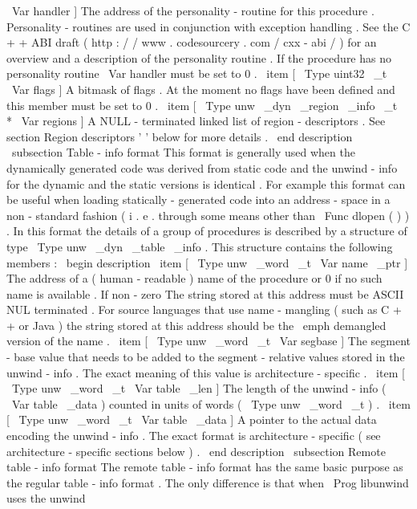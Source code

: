 \
Var
{
handler
}
]
The
address
of
the
personality
-
routine
for
this
procedure
.
Personality
-
routines
are
used
in
conjunction
with
exception
handling
.
See
the
C
+
+
ABI
draft
(
http
:
/
/
www
.
codesourcery
.
com
/
cxx
-
abi
/
)
for
an
overview
and
a
description
of
the
personality
routine
.
If
the
procedure
has
no
personality
routine
\
Var
{
handler
}
must
be
set
to
0
.
\
item
[
\
Type
{
uint32
\
_t
}
\
Var
{
flags
}
]
A
bitmask
of
flags
.
At
the
moment
no
flags
have
been
defined
and
this
member
must
be
set
to
0
.
\
item
[
\
Type
{
unw
\
_dyn
\
_region
\
_info
\
_t
~
*
}
\
Var
{
regions
}
]
A
NULL
-
terminated
linked
list
of
region
-
descriptors
.
See
section
Region
descriptors
'
'
below
for
more
details
.
\
end
{
description
}
\
subsection
{
Table
-
info
format
}
This
format
is
generally
used
when
the
dynamically
generated
code
was
derived
from
static
code
and
the
unwind
-
info
for
the
dynamic
and
the
static
versions
is
identical
.
For
example
this
format
can
be
useful
when
loading
statically
-
generated
code
into
an
address
-
space
in
a
non
-
standard
fashion
(
i
.
e
.
through
some
means
other
than
\
Func
{
dlopen
}
(
)
)
.
In
this
format
the
details
of
a
group
of
procedures
is
described
by
a
structure
of
type
\
Type
{
unw
\
_dyn
\
_table
\
_info
}
.
This
structure
contains
the
following
members
:
\
begin
{
description
}
\
item
[
\
Type
{
unw
\
_word
\
_t
}
\
Var
{
name
\
_ptr
}
]
The
address
of
a
(
human
-
readable
)
name
of
the
procedure
or
0
if
no
such
name
is
available
.
If
non
-
zero
The
string
stored
at
this
address
must
be
ASCII
NUL
terminated
.
For
source
languages
that
use
name
-
mangling
(
such
as
C
+
+
or
Java
)
the
string
stored
at
this
address
should
be
the
\
emph
{
demangled
}
version
of
the
name
.
\
item
[
\
Type
{
unw
\
_word
\
_t
}
\
Var
{
segbase
}
]
The
segment
-
base
value
that
needs
to
be
added
to
the
segment
-
relative
values
stored
in
the
unwind
-
info
.
The
exact
meaning
of
this
value
is
architecture
-
specific
.
\
item
[
\
Type
{
unw
\
_word
\
_t
}
\
Var
{
table
\
_len
}
]
The
length
of
the
unwind
-
info
(
\
Var
{
table
\
_data
}
)
counted
in
units
of
words
(
\
Type
{
unw
\
_word
\
_t
}
)
.
\
item
[
\
Type
{
unw
\
_word
\
_t
}
\
Var
{
table
\
_data
}
]
A
pointer
to
the
actual
data
encoding
the
unwind
-
info
.
The
exact
format
is
architecture
-
specific
(
see
architecture
-
specific
sections
below
)
.
\
end
{
description
}
\
subsection
{
Remote
table
-
info
format
}
The
remote
table
-
info
format
has
the
same
basic
purpose
as
the
regular
table
-
info
format
.
The
only
difference
is
that
when
\
Prog
{
libunwind
}
uses
the
unwind

